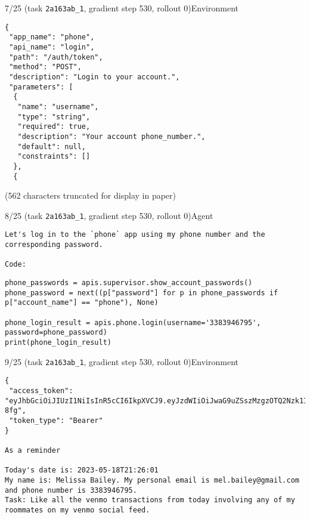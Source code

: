 \hspace*{8mm}%
\begin{minipage}{0.95\linewidth}
\begin{user_message_box}{{7/25 (task \texttt{2a163ab\_1}, gradient step 530, rollout 0)\hfill Environment}}
\scriptsize
\begin{Verbatim}[breaklines]
{
 "app_name": "phone",
 "api_name": "login",
 "path": "/auth/token",
 "method": "POST",
 "description": "Login to your account.",
 "parameters": [
  {
   "name": "username",
   "type": "string",
   "required": true,
   "description": "Your account phone_number.",
   "default": null,
   "constraints": []
  },
  {
\end{Verbatim}
(562 characters truncated for display in paper)\end{user_message_box}
\end{minipage}

\begin{minipage}{0.95\linewidth}
\begin{assistant_message_box}{{8/25 (task \texttt{2a163ab\_1}, gradient step 530, rollout 0)\hfill Agent}}
\scriptsize
\begin{Verbatim}[breaklines]
Let's log in to the `phone` app using my phone number and the corresponding password.

Code:
\end{Verbatim}
\begin{tcolorbox}[colback=codebgcolor,boxrule=0pt]\begin{Verbatim}[breaklines]
phone_passwords = apis.supervisor.show_account_passwords()
phone_password = next((p["password"] for p in phone_passwords if p["account_name"] == "phone"), None)

phone_login_result = apis.phone.login(username='3383946795', password=phone_password)
print(phone_login_result)
\end{Verbatim}
\end{tcolorbox}\end{assistant_message_box}
\end{minipage}

\hspace*{8mm}%
\begin{minipage}{0.95\linewidth}
\begin{user_message_box}{{9/25 (task \texttt{2a163ab\_1}, gradient step 530, rollout 0)\hfill Environment}}
\scriptsize
\begin{Verbatim}[breaklines]
{
 "access_token": "eyJhbGciOiJIUzI1NiIsInR5cCI6IkpXVCJ9.eyJzdWIiOiJwaG9uZSszMzgzOTQ2Nzk1IiwiZXhwIjoxNjg0NDQ2MDU5fQ.w_zONtvSuFS54CO3a0MwM10Y13Xi0FKeVgRBipP-8fg",
 "token_type": "Bearer"
}

As a reminder

Today's date is: 2023-05-18T21:26:01
My name is: Melissa Bailey. My personal email is mel.bailey@gmail.com and phone number is 3383946795.
Task: Like all the venmo transactions from today involving any of my roommates on my venmo social feed.
\end{Verbatim}
\end{user_message_box}
\end{minipage}


